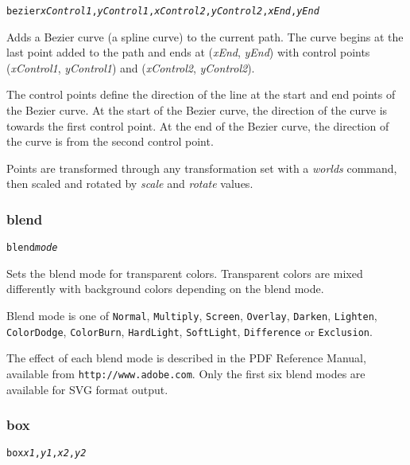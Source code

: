 \begin{alltt}
bezier \textit{xControl1}, \textit{yControl1}, \textit{xControl2}, \textit{yControl2}, \textit{xEnd}, \textit{yEnd}
\end{alltt}

Adds a Bezier curve (a spline curve) to the current path.  The curve begins at
the last point added to the path and ends at (\textit{xEnd}, \textit{yEnd})
with control points (\textit{xControl1}, \textit{yControl1}) and
(\textit{xControl2}, \textit{yControl2}).

The control points define the direction of the line at the start and
end points of the Bezier curve.
At the start of the Bezier curve, the direction of the curve is towards
the first control point.
At the end of the Bezier curve, the direction of the curve is from
the second control point.

Points are transformed through any
transformation set with a \textit{worlds} command,
then scaled and rotated by \textit{scale}
and \textit{rotate} values.

\subsubsection{blend}

\begin{alltt}
blend \textit{mode}
\end{alltt}

Sets the blend mode for transparent colors.
Transparent colors are mixed differently with background
colors depending on the blend mode.

Blend mode is one of \texttt{Normal},
\texttt{Multiply},
\texttt{Screen},
\texttt{Overlay},
\texttt{Darken},
\texttt{Lighten},
\texttt{ColorDodge},
\texttt{ColorBurn},
\texttt{HardLight},
\texttt{SoftLight},
\texttt{Difference} or
\texttt{Exclusion}.

The effect of each blend mode is described in the PDF Reference Manual,
available from \texttt{http://www.adobe.com}.
Only the first six blend modes are available for SVG format output.

\subsubsection{box}

\begin{alltt}
box \textit{x1}, \textit{y1}, \textit{x2}, \textit{y2}
\end{alltt}

